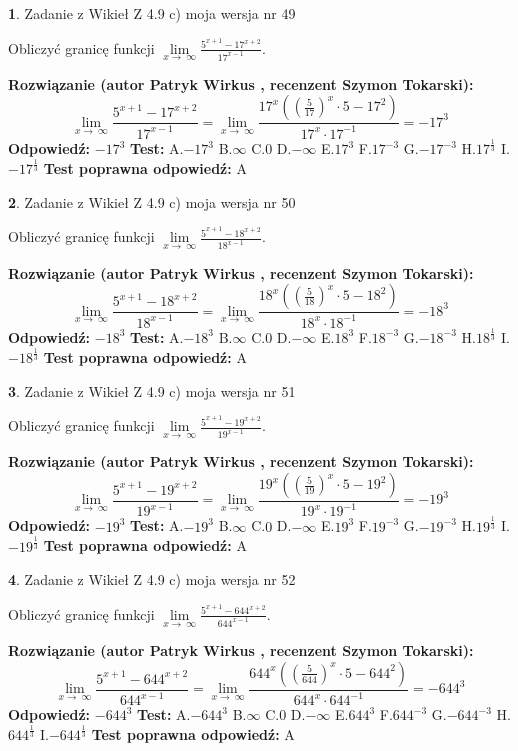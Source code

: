 \documentclass[12pt, a4paper]{article}
\theoremstyle{definition} %
\newtheorem{zad}{}
\newcommand{\zadStart}[1]{\begin{zad}#1\newline}
\newcommand{\zadStop}{\end{zad}}
\newcommand{\rozwStart}[2]{\noindent \textbf{Rozwiązanie (autor #1 , recenzent #2): }\newline}
\newcommand{\rozwStop}{\newline}
\newcommand{\odpStart}{\noindent \textbf{Odpowiedź:}\newline}
\newcommand{\odpStop}{\newline}
\newcommand{\testStart}{\noindent \textbf{Test:}\newline}
\newcommand{\testStop}{\newline}
\newcommand{\kluczStart}{\noindent \textbf{Test poprawna odpowiedź:}\newline}
\newcommand{\kluczStop}{\newline}
\begin{document}
\zadStart{Zadanie z Wikieł Z 4.9 c) moja wersja nr 49}


Obliczyć granicę funkcji  $\lim\limits_{x\to\ \infty}\frac{5^{x+1}-17^{x+2}}{17^{x-1}}$.
\zadStop
\rozwStart{Patryk Wirkus}{Szymon Tokarski}
$$\lim\limits_{x\to\ \infty}\frac{5^{x+1}-17^{x+2}}{17^{x-1}}=\lim\limits_{x\to\ \infty}\frac{17^{x}((\frac{5}{17})^{x}\cdot 5 -17^{2})}{17^{x}\cdot 17^{-1}} = -17^{3}$$
\rozwStop
\odpStart
$-17^{3}$
\odpStop
\testStart
A.$-17^{3}$ B.$\infty$ C.$0$ D.$-\infty$ E.$17^{3}$
F.$17^{-3}$ G.$-17^{-3}$
H.$17^{\frac{1}{3}}$
I.$-17^{\frac{1}{3}}$
\testStop
\kluczStart
A
\kluczStop



\zadStart{Zadanie z Wikieł Z 4.9 c) moja wersja nr 50}


Obliczyć granicę funkcji  $\lim\limits_{x\to\ \infty}\frac{5^{x+1}-18^{x+2}}{18^{x-1}}$.
\zadStop
\rozwStart{Patryk Wirkus}{Szymon Tokarski}
$$\lim\limits_{x\to\ \infty}\frac{5^{x+1}-18^{x+2}}{18^{x-1}}=\lim\limits_{x\to\ \infty}\frac{18^{x}((\frac{5}{18})^{x}\cdot 5 -18^{2})}{18^{x}\cdot 18^{-1}} = -18^{3}$$
\rozwStop
\odpStart
$-18^{3}$
\odpStop
\testStart
A.$-18^{3}$ B.$\infty$ C.$0$ D.$-\infty$ E.$18^{3}$
F.$18^{-3}$ G.$-18^{-3}$
H.$18^{\frac{1}{3}}$
I.$-18^{\frac{1}{3}}$
\testStop
\kluczStart
A
\kluczStop



\zadStart{Zadanie z Wikieł Z 4.9 c) moja wersja nr 51}


Obliczyć granicę funkcji  $\lim\limits_{x\to\ \infty}\frac{5^{x+1}-19^{x+2}}{19^{x-1}}$.
\zadStop
\rozwStart{Patryk Wirkus}{Szymon Tokarski}
$$\lim\limits_{x\to\ \infty}\frac{5^{x+1}-19^{x+2}}{19^{x-1}}=\lim\limits_{x\to\ \infty}\frac{19^{x}((\frac{5}{19})^{x}\cdot 5 -19^{2})}{19^{x}\cdot 19^{-1}} = -19^{3}$$
\rozwStop
\odpStart
$-19^{3}$
\odpStop
\testStart
A.$-19^{3}$ B.$\infty$ C.$0$ D.$-\infty$ E.$19^{3}$
F.$19^{-3}$ G.$-19^{-3}$
H.$19^{\frac{1}{3}}$
I.$-19^{\frac{1}{3}}$
\testStop
\kluczStart
A
\kluczStop



\zadStart{Zadanie z Wikieł Z 4.9 c) moja wersja nr 52}


Obliczyć granicę funkcji  $\lim\limits_{x\to\ \infty}\frac{5^{x+1}-644^{x+2}}{644^{x-1}}$.
\zadStop
\rozwStart{Patryk Wirkus}{Szymon Tokarski}
$$\lim\limits_{x\to\ \infty}\frac{5^{x+1}-644^{x+2}}{644^{x-1}}=\lim\limits_{x\to\ \infty}\frac{644^{x}((\frac{5}{644})^{x}\cdot 5 -644^{2})}{644^{x}\cdot 644^{-1}} = -644^{3}$$
\rozwStop
\odpStart
$-644^{3}$
\odpStop
\testStart
A.$-644^{3}$ B.$\infty$ C.$0$ D.$-\infty$ E.$644^{3}$
F.$644^{-3}$ G.$-644^{-3}$
H.$644^{\frac{1}{3}}$
I.$-644^{\frac{1}{3}}$
\testStop
\kluczStart
A
\kluczStop
\end{document}
